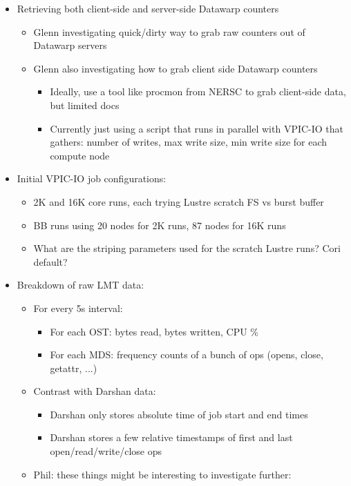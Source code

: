 \documentclass[conference,10pt,compsocconf]{IEEEtran}
\begin{document}
\begin{itemize}
\item Retrieving both client-side and server-side Datawarp counters
    \begin{itemize}
    \item Glenn investigating quick/dirty way to grab raw counters out of Datawarp servers
    \item Glenn also investigating how to grab client side Datawarp counters
        \begin{itemize}
        \item Ideally, use a tool like procmon from NERSC to grab client-side data, but limited docs
        \item Currently just using a script that runs in parallel with VPIC-IO that gathers:
              number of writes, max write size, min write size for each compute node
        \end{itemize}
    \end{itemize}
\item Initial VPIC-IO job configurations:
    \begin{itemize}
    \item 2K and 16K core runs, each trying Lustre scratch FS vs burst buffer
    \item BB runs using 20 nodes for 2K runs, 87 nodes for 16K runs
    \item What are the striping parameters used for the scratch Lustre runs? Cori default?
    \end{itemize}
\item Breakdown of raw LMT data:
    \begin{itemize}
    \item For every 5s interval:
        \begin{itemize}
        \item For each OST: bytes read, bytes written, CPU \%
        \item For each MDS: frequency counts of a bunch of ops (opens, close, getattr, ...)
        \end{itemize}
    \item Contrast with Darshan data:
        \begin{itemize}
        \item Darshan only stores absolute time of job start and end times
        \item Darshan stores a few relative timestamps of first and last open/read/write/close ops
        \end{itemize}
    \item Phil: these things might be interesting to investigate further:

\end{itemize}
\end{itemize}
\end{document}
